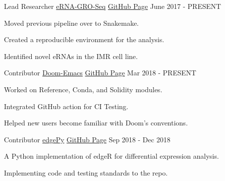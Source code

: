 
\begin{cventries}

	\cventry
	{Lead Researcher} %
	{\href{https://github.com/Emiller88/eRNA-GRO-Seq/}{eRNA-GRO-Seq}} %
	{\href{https://github.com/Emiller88/eRNA-GRO-Seq/}{GitHub Page}} %
	{June 2017 - PRESENT} %
	{
		\begin{cvitems} %
			\item {Moved previous pipeline over to Snakemake.}
			\item {Created a reproducible environment for the analysis.}
			\item {Identified novel eRNAs in the IMR cell line.}
		\end{cvitems}
	}

	\cventry
	{Contributor} %
	{\href{https://github.com/hlissner/doom-emacs}{Doom-Emacs}} %
	{\href{https://github.com/hlissner/doom-emacs}{GitHub Page}} %
	{Mar 2018 - PRESENT} %
	{
		\begin{cvitems} %
			\item {Worked on Reference, Conda, and Solidity modules.}
			\item {Integrated GitHub action for CI Testing.}
			\item {Helped new users become familiar with Doom's conventions.}
		\end{cvitems}
	}

	\cventry
	{Contributor} %
	{\href{https://github.com/r-bioinformatics/edgePy}{edgePy}} %
	{\href{https://github.com/r-bioinformatics/edgePy}{GitHub Page}} %
	{Sep 2018 - Dec 2018} %
	{
		\begin{cvitems} %
			\item {A Python implementation of edgeR for differential expression analysis.}
			\item {Implementing code and testing standards to the repo.}
		\end{cvitems}
	}


\end{cventries}
